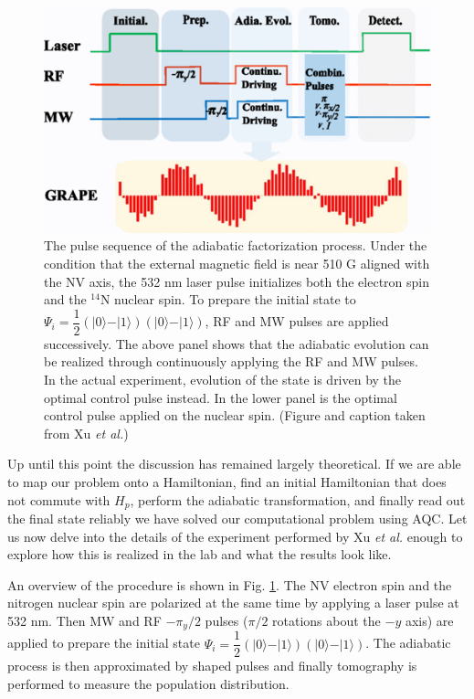 \documentclass[%
 reprint,
 amsmath,amssymb,
 aps,
]{revtex4-1}
\begin{document}
	\begin{figure}
	\includegraphics[scale=0.49]{Fig2XuEtAl}
	\caption{	
		The pulse sequence of the adiabatic factorization process. Under the condition that the external magnetic field is near 510 G aligned with the NV axis, the 532 nm laser pulse initializes both the electron spin and the $^{14}$N nuclear spin. To prepare the initial state to $\Psi_i = \dfrac{1}{2}\left(\vert 0 \rangle - \vert 1 \rangle   \right)\left(\vert 0 \rangle - \vert 1 \rangle   \right)$, RF and MW pulses are applied successively. The above panel shows that the adiabatic evolution can be realized through continuously applying the RF and MW pulses. In the actual experiment, evolution of the state is driven by the optimal control pulse instead. In the lower panel is the optimal control pulse applied on the nuclear spin. (Figure and caption taken from Xu \textit{et al.}\cite{Xu2017})
	}
	\label{fig:pulse}
	\end{figure}	
	
	Up until this point the discussion has remained largely theoretical. If we are able to map our problem onto a Hamiltonian, find an initial Hamiltonian that does not commute with $H_p$, perform the adiabatic transformation, and finally read out the final state reliably we have solved our computational problem using AQC. Let us now delve into the details of the experiment performed by Xu \textit{et al.} enough to explore how this is realized in the lab and what the results look like. 
	
	An overview of the procedure is shown in Fig. \ref{fig:pulse}. The NV electron spin and the nitrogen nuclear spin are polarized at the same time by applying a laser pulse at 532 nm. Then MW and RF $-\pi_y/2$ pulses ($\pi/2$ rotations about the $-y$ axis) are applied to prepare the initial state $\Psi_i = \dfrac{1}{2}\left(\vert 0 \rangle - \vert 1 \rangle   \right)\left(\vert 0 \rangle - \vert 1 \rangle   \right)$. The adiabatic process is then approximated by shaped pulses and finally tomography is performed to measure the population distribution. 
\end{document}
